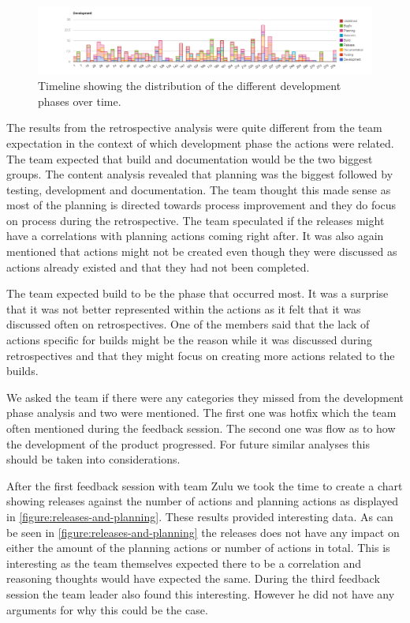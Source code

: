 \begin{figure}
	\centering
	\includegraphics[width=\textwidth, keepaspectratio]{figures/development-l.png}
	\caption{Timeline showing the distribution of the different development phases over time.}
	\label{figure:development-l}
\end{figure}

The results from the retrospective analysis were quite different from the team expectation in the context of which development phase the actions were related. The team expected that build and documentation would be the two biggest groups. The content analysis revealed that planning was the biggest followed by testing, development and documentation. The team thought this made sense as most of the planning is directed towards process improvement and they do focus on process during the retrospective. The team speculated if the releases might have a correlations with planning actions coming right after. It was also again mentioned that actions might not be created even though they were discussed as actions already existed and that they had not been completed. 

The team expected build to be the phase that occurred most. It was a surprise that it was not better represented within the actions as it felt that it was discussed often on retrospectives. One of the members said that the lack of actions specific for builds might be the reason while it was discussed during retrospectives and that they might focus on creating more actions related to the builds. 

We asked the team if there were any categories they missed from the development phase analysis and two were mentioned. The first one was hotfix which the team often mentioned during the feedback session. The second one was flow as to how the development of the product progressed. For future similar analyses this should be taken into considerations. 

After the first feedback session with team Zulu we took the time to create a chart showing releases against the number of actions and planning actions as displayed in \autoref{figure:releases-and-planning}. These results provided interesting data. As can be seen in \autoref{figure:releases-and-planning} the releases does not have any impact on either the amount of the planning actions or number of actions in total. This is interesting as the team themselves expected there to be a correlation and reasoning thoughts would have expected the same. During the third feedback session the team leader also found this interesting. However he did not have any arguments for why this could be the case.

